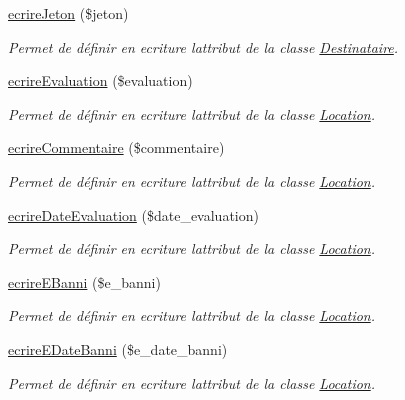 \begin{DoxyCompactItemize}
\hyperlink{class_location_a7a9107c7f4f6bf5dac4a6d1e614462ad}{ecrire\+Jeton} (\$jeton)
\begin{DoxyCompactList}\small\item\em Permet de définir en ecriture l\textquotesingle{}attribut de la classe \hyperlink{class_destinataire}{Destinataire}. \end{DoxyCompactList}\item 
\hyperlink{class_location_a8fe8652c6584da5f2cc3dff239fd4640}{ecrire\+Evaluation} (\$evaluation)
\begin{DoxyCompactList}\small\item\em Permet de définir en ecriture l\textquotesingle{}attribut de la classe \hyperlink{class_location}{Location}. \end{DoxyCompactList}\item 
\hyperlink{class_location_ac3587e0251d5f719a3a013813c8b4dd4}{ecrire\+Commentaire} (\$commentaire)
\begin{DoxyCompactList}\small\item\em Permet de définir en ecriture l\textquotesingle{}attribut de la classe \hyperlink{class_location}{Location}. \end{DoxyCompactList}\item 
\hyperlink{class_location_a6a2d79406521e460cb6754c30e53c991}{ecrire\+Date\+Evaluation} (\$date\+\_\+evaluation)
\begin{DoxyCompactList}\small\item\em Permet de définir en ecriture l\textquotesingle{}attribut de la classe \hyperlink{class_location}{Location}. \end{DoxyCompactList}\item 
\hyperlink{class_location_a7dc2086d6b996c3a184515bf9fd338a4}{ecrire\+E\+Banni} (\$e\+\_\+banni)
\begin{DoxyCompactList}\small\item\em Permet de définir en ecriture l\textquotesingle{}attribut de la classe \hyperlink{class_location}{Location}. \end{DoxyCompactList}\item 
\hyperlink{class_location_aa1d4fe362f94b688a3abe9268f4a84ca}{ecrire\+E\+Date\+Banni} (\$e\+\_\+date\+\_\+banni)
\begin{DoxyCompactList}\small\item\em Permet de définir en ecriture l\textquotesingle{}attribut de la classe \hyperlink{class_location}{Location}. \end{DoxyCompactList}\item 

\end{DoxyCompactItemize}
